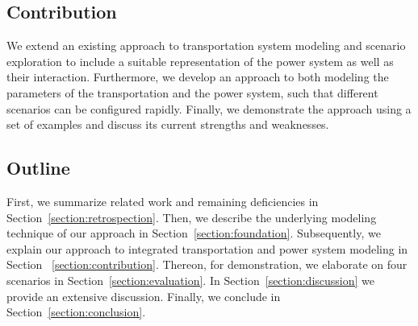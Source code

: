 \subsection{Contribution}

We extend an existing approach to transportation system modeling and scenario exploration to include a suitable representation of the power system as well as their interaction. Furthermore, we develop an approach to both modeling the parameters of the transportation and the power system, such that different scenarios can be configured rapidly. Finally, we demonstrate the approach using a set of examples and discuss its current strengths and weaknesses.

\subsection{Outline}

First, we summarize related work and remaining deficiencies in Section~\ref{section:retrospection}. Then, we describe the underlying modeling technique of our approach in Section~\ref{section:foundation}. Subsequently, we explain our approach to integrated transportation and power system modeling in Section ~\ref{section:contribution}. Thereon, for demonstration, we elaborate on four scenarios in Section~\ref{section:evaluation}. In Section~\ref{section:discussion} we provide an extensive discussion. Finally, we conclude in Section~\ref{section:conclusion}.